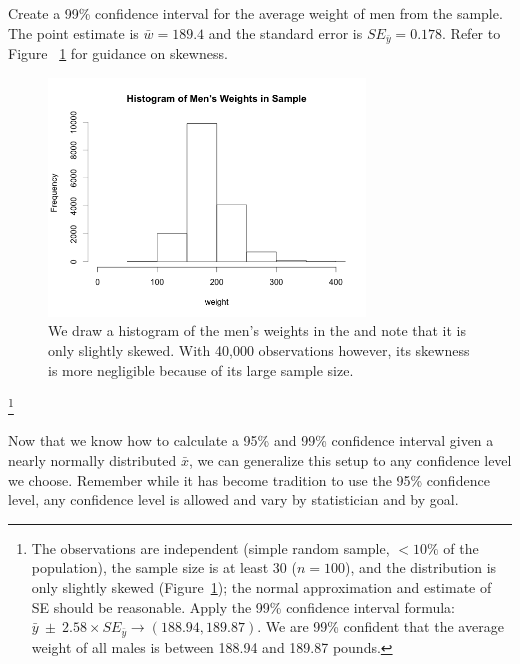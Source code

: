 \begin{exercise} \label{find99CIForBRFSSWeightExercise}
Create a 99\% confidence interval for the average weight of men from the  sample. The point estimate is $\bar{w} = 189.4$ and the standard error is $SE_{\bar{y}} = 0.178$. Refer to Figure ~\ref{brfssSampHist} for guidance on skewness.
\begin{figure}
\centering
\includegraphics[width=0.75\textwidth]{ch_inference_foundations_oi_biostat/figures/choosingZForCI/brfssSampHist.png}
\caption{We draw a histogram of the men's weights in the  and note that it is only slightly skewed. With 40,000 observations however, its skewness is more negligible because of its large sample size.}
\label{brfssSampHist}
\end{figure}
\footnote{The observations are independent (simple random sample, $<10\%$ of the population), the sample size is at least 30 ($n=100$), and the distribution is only slightly skewed (Figure~\ref{brfssSampHist}); the normal approximation and estimate of SE should be reasonable.  Apply the 99\% confidence interval formula: $\bar{y}\ \pm\ 2.58 \times  SE_{\bar{y}} \rightarrow (188.94, 189.87)$. We are 99\% confident that the average weight of all males is between 188.94 and 189.87 pounds.}
\end{exercise}

Now that we know how to calculate a 95\% and 99\% confidence interval given a nearly normally distributed $\bar{x}$, we can generalize this setup to any confidence level we choose. Remember while it has become tradition to use the 95\% confidence level, any confidence level is allowed and vary by statistician and by goal. 

